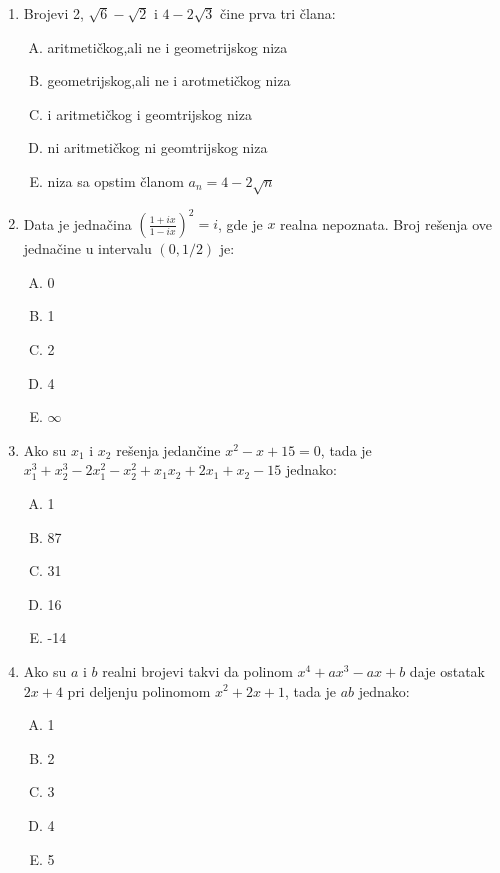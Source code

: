 \documentclass[a4paper,12pt]{report}
\begin{document}
\begin{enumerate}[1.]
\item Brojevi 2, $\sqrt{6} - \sqrt{2} $ i $4 - 2\sqrt{3}$ \v{c}ine prva tri \v{c}lana:
\begin{enumerate}[A)]
\item aritmeti\v{c}kog,ali ne i geometrijskog niza 
\item geometrijskog,ali ne i arotmeti\v{c}kog niza
\item i aritmeti\v{c}kog i geomtrijskog niza
\item ni aritmeti\v{c}kog ni geomtrijskog niza
\item niza sa opstim \v{c}lanom $a_n = 4 - 2\sqrt{n} $
\end{enumerate}

\item Data je jedna\v{c}ina $(\frac{1 + ix}{1 - ix})^2 = i $, gde je $x$ realna nepoznata. Broj re\v{s}enja ove jedna\v{c}ine u intervalu $(0,1/2)$ je:
\begin{multicols}{5}
\begin{enumerate}[A)]
\item 0 \item 1 \item 2 \item 4 \item $\infty$
\end{enumerate}
\end{multicols}

\item Ako su $x_1$ i $x_2$ re\v{s}enja jedan\v{c}ine $x^2 - x + 15 = 0$, tada je $x_1^3 + x_2^3 - 2x_1^2 - x_2^2 + x_1x_2 + 2x_1 + x_2 -15 $ jednako:
\begin{multicols}{5}
\begin{enumerate}[A)]
\item 1 \item 87 \item 31 \item 16 \item -14
\end{enumerate}
\end{multicols}

\item Ako su $a$ i $b$ realni brojevi takvi da polinom  $x^4 + ax^3 -ax +b $ daje ostatak $2x+4$  pri deljenju polinomom $x^2 + 2x+ 1$, tada je $ab$ jednako:
\begin{multicols}{5}
\begin{enumerate}[A)]
\item 1 \item 2 \item 3 \item 4 \item 5
\end{enumerate}
\end{multicols}


\end{enumerate}
\end{document}
